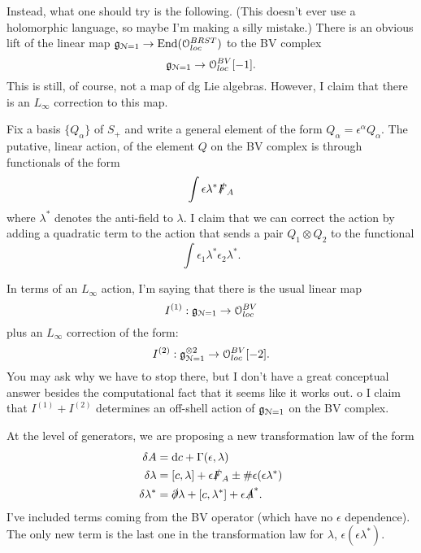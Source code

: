 \documentclass[10pt, oneside]{article}
\renewcommand{\d}{\mathrm{d}}
\begin{document}
Instead, what one should try is the following. 
(This doesn't ever use a holomorphic language, so maybe I'm making a silly mistake.)
There is an obvious lift of the linear map $\mathfrak{g}_{\mathcal{N}=1} \to {\rm End}(\mathcal{O}_{loc}^{BRST})$ to the BV complex
\[
\mathfrak{g}_{\mathcal{N}=1} \to \mathcal{O}_{loc}^{BV} [-1] .
\]
This is still, of course, not a map of dg Lie algebras.
However, I claim that there is an $L_\infty$ correction to this map. 

Fix a basis $\{Q_\alpha\}$ of $S_+$ and write a general element of the form $Q_{\alpha} = \epsilon^\alpha Q_\alpha$.
The putative, linear action, of the element $Q$ on the BV complex is through functionals of the form
\[
\int \epsilon \lambda^* \slashed{F}_A 
\]
where $\lambda^*$ denotes the anti-field to $\lambda$. 
I claim that we can correct the action by adding a quadratic term to the action that sends a pair $Q_1 \otimes Q_2$ to the functional
\[
\int \epsilon_1 \lambda^* \epsilon_2 \lambda^*  .
\] 

In terms of an $L_\infty$ action, I'm saying that there is the usual linear map
\[
I^{(1)} : \mathfrak{g}_{\mathcal{N}=1} \to \mathcal{O}_{loc}^{BV} 
\]
plus an $L_\infty$ correction of the form:
\[
I^{(2)} : \mathfrak{g}_{\mathcal{N}=1}^{\otimes 2} \to \mathcal{O}_{loc}^{BV} [-2]  .
\]
You may ask why we have to stop there, but I don't have a great conceptual answer besides the computational fact that it seems like it works out. o
I claim that $I^{(1)} + I^{(2)}$ determines an off-shell action of $\mathfrak{g}_{\mathcal{N}=1}$ on the BV complex. 

At the level of generators, we are proposing a new transformation law of the form 
\begin{align*}
\delta A &= \d c + \Gamma(\epsilon,\lambda) \\
\delta \lambda &= [c,\lambda] + \epsilon \sd F_A  \pm \# \epsilon (\epsilon \lambda^*)  \\
\delta \lambda^* &= \sd \partial \lambda + [c, \lambda^*] + \epsilon \sd A^*  .
\end{align*}
I've included terms coming from the BV operator (which have no $\epsilon$ dependence). 
The only new term is the last one in the transformation law for $\lambda$, $\epsilon (\epsilon \lambda^*)$. 
\end{document}

